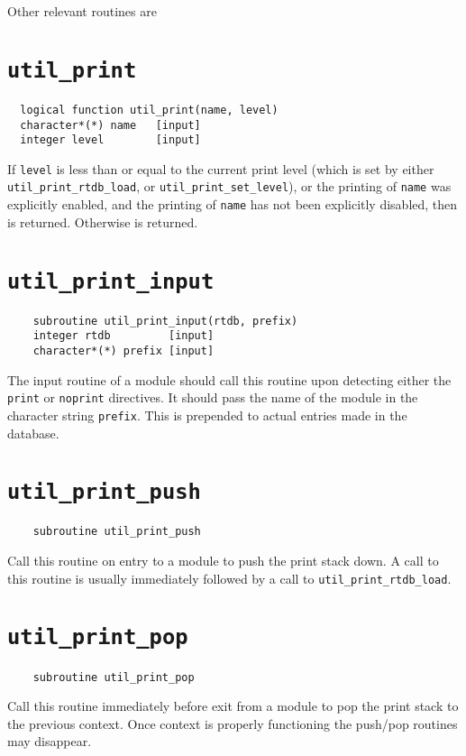 Other relevant routines are

\section{{\tt util\_print}}
\sloppy
\begin{verbatim}
  logical function util_print(name, level)
  character*(*) name   [input]
  integer level        [input]
\end{verbatim}
If \verb+level+ is less than or equal to the current print level
(which is set by either \verb+util_print_rtdb_load+, or
\verb+util_print_set_level+), or the printing of \verb+name+ was
explicitly enabled, and the printing of \verb+name+ has not been
explicitly disabled, then \TRUE is returned.  Otherwise
\FALSE is returned.

\fussy

\section{{\tt util\_print\_input}}
\begin{verbatim}
    subroutine util_print_input(rtdb, prefix)
    integer rtdb         [input]
    character*(*) prefix [input]
\end{verbatim}
The input routine of a module should call this routine upon detecting
either the {\tt print} or {\tt noprint} directives.  It should pass
the name of the module in the character string {\tt prefix}.  This is
prepended to actual entries made in the database.

\section{{\tt util\_print\_push}}
\begin{verbatim}
    subroutine util_print_push
\end{verbatim}
Call this routine on entry to a module to push the print stack down.
A call to this routine is usually immediately followed by a call to
\verb+util_print_rtdb_load+. 

\section{{\tt util\_print\_pop}}
\begin{verbatim}
    subroutine util_print_pop
\end{verbatim}
Call this routine immediately before exit from a module to pop the
print stack to the previous context.  Once context is properly
functioning the push/pop routines may disappear.

